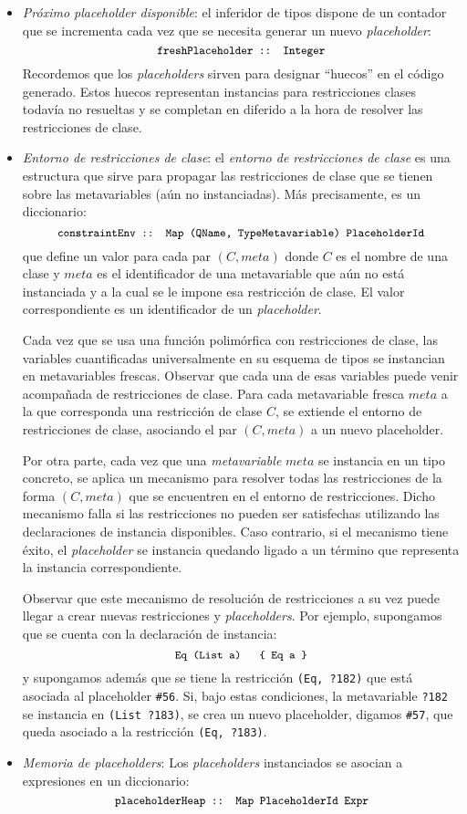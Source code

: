 \begin{itemize}
  \item {\em Próximo {\em placeholder} disponible}:
    el inferidor de tipos dispone de un contador que se incrementa cada
    vez que se necesita generar un nuevo {\em placeholder}:
    \[ {\small \texttt{freshPlaceholder :: Integer}} \]
    Recordemos que los {\em placeholders} sirven para designar ``huecos''
    en el código generado. Estos huecos representan instancias para
    restricciones clases todavía no resueltas
    y se completan en diferido a la hora de resolver las restricciones de clase.
  \item {\em Entorno de restricciones de clase}:
    el {\em entorno de restricciones de clase} es una estructura
    que sirve para propagar las restricciones de clase que se tienen sobre
    las metavariables (aún no instanciadas).
    Más precisamente, es un diccionario:
    \[ {\small \texttt{constraintEnv :: Map (QName, TypeMetavariable) PlaceholderId}} \]
    que define un valor para cada par $(C, meta)$ donde $C$ es el nombre de una clase
    y $meta$ es el identificador de una metavariable que aún no está instanciada y a la cual
    se le impone esa restricción de clase.
    El valor correspondiente es un identificador de un {\em placeholder}.
    
    Cada vez que se usa una función polimórfica con restricciones de clase,
    las variables cuantificadas universalmente en su esquema de tipos
    se instancian en metavariables frescas.
    Observar que cada una de esas variables puede venir acompañada de
    restricciones de clase. Para cada metavariable fresca $meta$
    a la que corresponda una restricción de clase $C$,
    se extiende el entorno de restricciones de clase,
    asociando el par $(C, meta)$ a un nuevo placeholder.

    Por otra parte, cada vez que una {\em metavariable} $meta$ se instancia
    en un tipo concreto, se aplica un mecanismo
    para resolver todas las restricciones de la forma $(C,meta)$
    que se encuentren en el entorno de restricciones.
    Dicho mecanismo falla si las restricciones no pueden ser
    satisfechas utilizando las declaraciones de instancia disponibles.
    Caso contrario, si el mecanismo tiene éxito, el {\em placeholder}
    se instancia quedando ligado a un término
    que representa la instancia correspondiente.

    Observar que este mecanismo de resolución de restricciones
    a su vez puede llegar a crear nuevas restricciones y {\em placeholders}.
    Por ejemplo, supongamos que se cuenta con la declaración de instancia:
    \[ {\small \texttt{Eq (List a) \ \ \{ Eq a \}}} \]
    y supongamos además que se tiene la restricción \verb|(Eq, ?182)|
    que está asociada al placeholder \verb|#56|.
    Si, bajo estas condiciones, la metavariable \verb|?182|
    se instancia en \verb|(List ?183)|,
    se crea un nuevo placeholder, digamos \verb|#57|,
    que queda asociado a la restricción \verb|(Eq, ?183)|.
  \item {\em Memoria de {\em placeholders}}:
    Los {\em placeholders} instanciados se asocian a expresiones
    en un diccionario:
    \[ {\small \texttt{placeholderHeap :: Map PlaceholderId Expr}} \]
\end{itemize}

